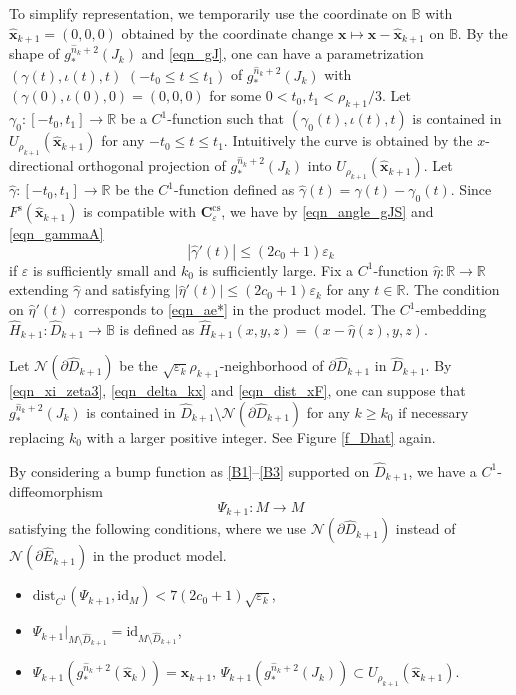 \documentclass{amsart}
\theoremstyle{plain}
\theoremstyle{definition}
\numberwithin{equation}{section}
\numberwithin{figure}{section}
\def\bb{\mathbb{B}}
\def\rr{\mathbb{R}}
\def\bx{{\boldsymbol{x}}}
\def\wh{\widehat}
\def\too{\longrightarrow}
\def\ve{\varepsilon}
\def\cs{{\mathrm{cs}}}
\def\rs{{\mathrm{s}}}
\begin{document}
To simplify representation, we temporarily use the coordinate on $\bb$ with $\wh \bx_{k+1}=(0,0,0)$ obtained by the coordinate change $\bx\longmapsto \bx-\wh\bx_{k+1}$ 
on $\bb$.
By the shape of $g_*^{\wh n_k+2}(J_k)$ and \eqref{eqn_gJ}, one can have a parametrization $(\gamma(t),\iota(t),t)$ $(-t_0\leq t\leq t_1)$ of $g_*^{\wh n_k+2}(J_k)$ with $(\gamma(0),\iota(0),0)=(0,0,0)$ 
for some $0<t_0,t_1<\rho_{k+1}/3$.
Let $\gamma_0:[-t_0, t_1]\too \rr$ be a $C^1$-function  such that 
$(\gamma_0(t),\iota(t),t)$ is contained in $U_{\rho_{k+1}}(\wh\bx_{k+1})$ for any 
$-t_0\leq t\leq t_1$.
Intuitively the curve is obtained by 
the $x$-directional orthogonal projection of $g^{\wh n_k+2}_*(J_k)$ into $U_{\rho_{k+1}}(\wh\bx_{k+1})$.
Let $\wh\gamma:[-t_0, t_1]\too \rr$ be the $C^1$-function 
defined as $\wh\gamma(t)=\gamma(t)-\gamma_0(t)$.
Since $F^{\rs}(\wh\bx_{k+1})$ is compatible with $\boldsymbol{C}_\ve^{\cs}$, 
we have by \eqref{eqn_angle_gJS} and \eqref{eqn_gammaA} 
\[
|\wh\gamma'(t)|\leq (2c_0+1)\ve_k
\]
if $\ve$ is sufficiently small and $k_0$ is sufficiently large.
Fix a $C^1$-function $\wh\eta:\rr\too \rr$ extending 
$\wh\gamma$ and satisfying 
$
|\wh\eta'(t)|\leq (2c_0+1)\ve_k
$
for any $t\in \rr$.
The condition on $\wh\eta'(t)$ corresponds to \eqref{eqn_ae*} in the product model.
The $C^1$-embedding $\wh H_{k+1}:\wh D_{k+1}\too \bb$ is 
defined as $\wh H_{k+1}(x,y,z)=(x-\wh\eta(z),y,z)$.



Let $\mathcal{N}(\partial \wh D_{k+1})$ be the $\sqrt{\ve_{k}}\rho_{k+1}$-neighborhood of $\partial \wh D_{k+1}$ in $\wh D_{k+1}$.
By \eqref{eqn_xi_zeta3}, \eqref{eqn_delta_kx} and \eqref{eqn_dist_xF}, one can suppose 
that $g_*^{\wh n_k+2}(J_k)$ is contained in $\wh D_{k+1}\setminus \mathcal{N}(\partial \wh D_{k+1})$ for any $k\geq k_0$ if necessary replacing $k_0$ with a larger positive integer.
See Figure \ref{f_Dhat} again.




By considering a bump function as \eqref{B1}--\eqref{B3} supported on $\wh D_{k+1}$, 
we have a $C^1$-diffeomorphism 
\begin{equation}\label{eqn_Psik+1}
\varPsi_{k+1}:M\too M
\end{equation}
satisfying the following conditions, where we use $\mathcal{N}(\partial \wh D_{k+1})$ instead of $\mathcal{N}(\partial \wh E_{k+1})$ in the product model.
\begin{itemize}
\setlength{\itemindent}{-16pt}
\item
$\mathrm{dist}_{C^1}(\varPsi_{k+1},\mathrm{id}_M)<7(2c_0+1)\sqrt{\ve_k}$,
\item
$\varPsi_{k+1}|_{M\setminus \wh D_{k+1}}=\mathrm{id}_{M\setminus \wh D_{k+1}}$,
\item
$\varPsi_{k+1}(g_*^{\wh n_k+2}(\wh\bx_k))=\wh\bx_{k+1}$,\quad  
$\varPsi_{k+1}(g_*^{\wh n_k+2}(J_k))\subset U_{\rho_{k+1}}(\wh\bx_{k+1})$.
\end{itemize}
\end{document}
